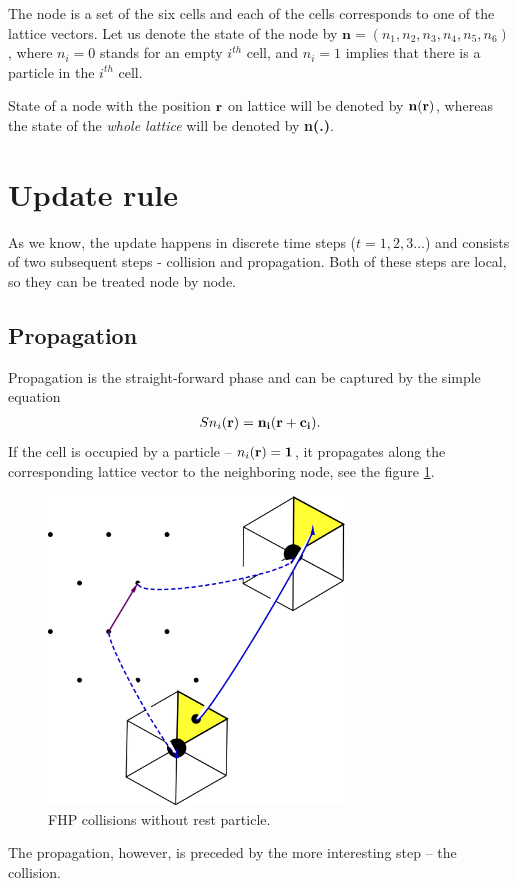 The node is a set of the six cells and each of the cells corresponds to one of the lattice vectors.
Let us denote the state of the node by $\bm{n} = (n_1,n_2,n_3,n_4,n_5,n_6)$, where $n_i = 0$ stands for an empty $i^{th}$ cell, and $n_i = 1$ implies that there is a particle in the $i^{th}$ cell. 

State of a node with the position $\bf{r}$ on lattice will be denoted by $\bf{n(r)}$, whereas the state of the \textit{whole lattice} will be denoted by \textbf{n(.)}.

\section{Update rule}
As we know, the update happens in discrete time steps ($t=1,2,3...$) and consists of two subsequent steps - collision and propagation. Both of these steps are local, so they can be treated node by node.

\subsection{Propagation}

Propagation is the straight-forward phase and can be captured by the simple equation
\begin{align*}
S n_i(\bf{r}) = n_i(\bf{r + c_i}). 
\end{align*}
If the cell is occupied by a particle -- $n_i(\bf{r})=1$, it propagates along the corresponding lattice vector to the neighboring node, see the figure \ref{FHPprop}.

\begin{figure}[H]
 \centering
 \includegraphics[width=0.7\textwidth]{./img/FHPprop}
 \caption{FHP collisions without rest particle.}
 \label{FHPprop}
\end{figure}
The propagation, however, is preceded by the more interesting step -- the collision.

